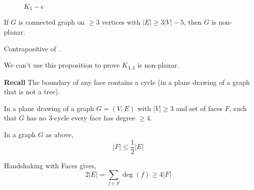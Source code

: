 \begin{figure}[H]

    \caption{$ K_5-e $}
\end{figure}


\begin{Proposition}{}{}
    If $ G $ is connected graph on $ \geqslant 3 $ vertices
    with $ |E|\geqslant 3|V|-5 $, then $ G $ is non-planar.
\end{Proposition}

\begin{Proof}{}{}
    Contrapositive of~.
\end{Proof}
We can't use this proposition to prove $ K_{3,3} $ is non-planar.

\textbf{Recall} The boundary of any face contains a cycle (in a plane drawing
of a graph that is not a tree).


\begin{Corollary}{}{}
    In a plane drawing of a graph $ G=(V,E) $ with
    $ |V|\geqslant 3 $ and set of faces $ F $, such that
    $ G $ has no $3$-cycle every face
    has degree $ \geqslant 4 $.
\end{Corollary}



\begin{Corollary}{}{}
    In a graph $ G $ as above,
    \[ |F|\leqslant \frac{1}{2} |E| \]
\end{Corollary}

\begin{Proof}{}{}
    Handshaking with Faces gives,
    \[ 2|E|=\sum\limits_{f\in F}\deg(f)\geqslant 4|F| \]
\end{Proof}


